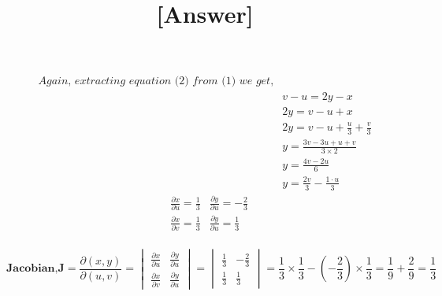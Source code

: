 \documentclass[12pt]{article}
\begin{document}
\begin{align*}
    \textit{Again, extracting equation (2) from (1) we get,}&\\
    & v-u = 2y -x\\
    & 2y = v-u +x\\
    & 2y = v - u + \frac{u}{3} + \frac{v}{3}\\
    & y = \frac{3v-3u+u+v}{3 \times 2}\\
    & y = \frac{4v-2u}{6}\\
    & y = \frac{2v}{3} - \frac{1\cdot u}{3}
\end{align*}
\pagebreak
\begin{align*}
    &\frac{\partial x}{\partial u} =\frac{1}{3} & \frac{\partial y}{\partial u} = -\frac{2}{3}\\
    &\frac{\partial x}{\partial v} =\frac{1}{3} & \frac{\partial y}{\partial u} = \frac{1}{3}\\
\end{align*}

\begin{equation*}
    \textbf{Jacobian,J}
    =\frac{\partial(x,y)}{\partial(u,v)} 
    = \begin{vmatrix}
    \frac{\partial x}{\partial u} & \frac{\partial y}{\partial u}\\ 
    \frac{\partial x}{\partial v} & \frac{\partial y}{\partial u}
    \end{vmatrix}
    = 
    \begin{vmatrix}
    \frac{1}{3} & -\frac{2}{3}\\ 
    \frac{1}{3} & \frac{1}{3}
    \end{vmatrix}
    = \frac{1}{3} \times \frac{1}{3} - \left(-\frac{2}{3} \right) \times \frac{1}{3}
    =\frac{1}{9} + \frac{2}{9} = \frac{1}{3}
\end{equation*}
\bigbreak
\centering \title{\textbf{[Answer]}}
\end{document}
